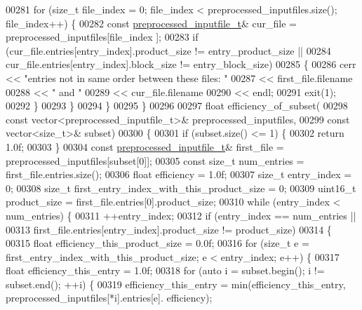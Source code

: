 \begin{DoxyCode}
{{00281     \textcolor{keywordflow}{for} (\textcolor{keywordtype}{size\_t} file\_index = 0; file\_index < preprocessed\_inputfiles.size(); file\_index++) \{
00282       \textcolor{keyword}{const} \hyperlink{structpreprocessed__inputfile__t}{preprocessed\_inputfile\_t}& cur\_file = preprocessed\_inputfiles[file\_index
      ];
00283       \textcolor{keywordflow}{if} (cur\_file.entries[entry\_index].product\_size != entry\_product\_size ||
00284           cur\_file.entries[entry\_index].block\_size != entry\_block\_size)
00285       \{
00286         cerr << \textcolor{stringliteral}{"entries not in same order between these files: "}
00287              << first\_file.filename
00288              << \textcolor{stringliteral}{" and "}
00289              << cur\_file.filename
00290              << endl;
00291         exit(1);
00292       \}
00293     \}
00294   \}
00295 \}
00296 
00297 \textcolor{keywordtype}{float} efficiency\_of\_subset(
00298         \textcolor{keyword}{const} vector<preprocessed\_inputfile\_t>& preprocessed\_inputfiles,
00299         \textcolor{keyword}{const} vector<size\_t>& subset)
00300 \{
00301   \textcolor{keywordflow}{if} (subset.size() <= 1) \{
00302     \textcolor{keywordflow}{return} 1.0f;
00303   \}
00304   \textcolor{keyword}{const} \hyperlink{structpreprocessed__inputfile__t}{preprocessed\_inputfile\_t}& first\_file = preprocessed\_inputfiles[subset[0]];
00305   \textcolor{keyword}{const} \textcolor{keywordtype}{size\_t} num\_entries = first\_file.entries.size();
00306   \textcolor{keywordtype}{float} efficiency = 1.0f;
00307   \textcolor{keywordtype}{size\_t} entry\_index = 0;
00308   \textcolor{keywordtype}{size\_t} first\_entry\_index\_with\_this\_product\_size = 0;
00309   uint16\_t product\_size = first\_file.entries[0].product\_size;
00310   \textcolor{keywordflow}{while} (entry\_index < num\_entries) \{
00311     ++entry\_index;
00312     \textcolor{keywordflow}{if} (entry\_index == num\_entries ||
00313         first\_file.entries[entry\_index].product\_size != product\_size)
00314     \{
00315       \textcolor{keywordtype}{float} efficiency\_this\_product\_size = 0.0f;
00316       \textcolor{keywordflow}{for} (\textcolor{keywordtype}{size\_t} e = first\_entry\_index\_with\_this\_product\_size; e < entry\_index; e++) \{
00317         \textcolor{keywordtype}{float} efficiency\_this\_entry = 1.0f;
00318         \textcolor{keywordflow}{for} (\textcolor{keyword}{auto} i = subset.begin(); i != subset.end(); ++i) \{
00319           efficiency\_this\_entry = min(efficiency\_this\_entry, preprocessed\_inputfiles[*i].entries[e].
      efficiency);
}}
\end{DoxyCode}
